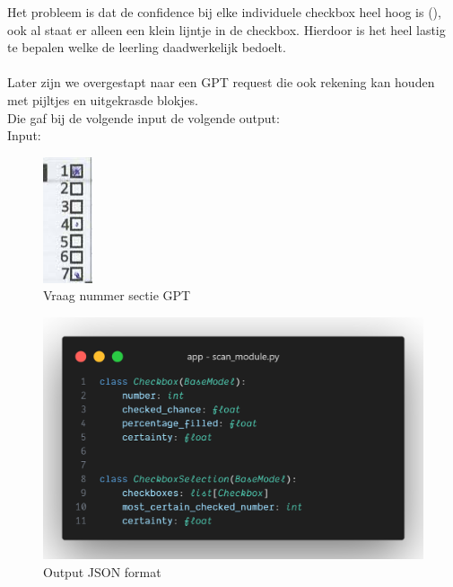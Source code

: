 \documentclass[12pt]{article}
\begin{document}
\begin{multicols}{2}
Het probleem is dat de confidence bij elke individuele checkbox heel hoog is (), ook al staat er alleen een klein lijntje in de checkbox. Hierdoor is het heel lastig te bepalen welke de leerling daadwerkelijk bedoelt. \\
\\
Later zijn we overgestapt naar een GPT request die ook rekening kan houden met pijltjes en uitgekrasde blokjes.\\
Die gaf bij de volgende input de volgende output:\\
Input: 
\begin{figure}[H]
    \centering
    \includegraphics[width=0.33\linewidth]{./images/methoden/inscannen/sectie/checkbox/vraagnummer/section_selection_input.png}
    \caption{Vraag nummer sectie GPT}
    \label{fig:enter-label}
\end{figure}
\begin{figure}[H]
    \centering
    \includegraphics[width=1\linewidth]{./images/methoden/inscannen/sectie/checkbox/vraagnummer/code-question-selector-format.png}
    \caption{Output JSON format}
    \label{fig:enter-label}
\end{figure}


\end{multicols}
\end{document}
